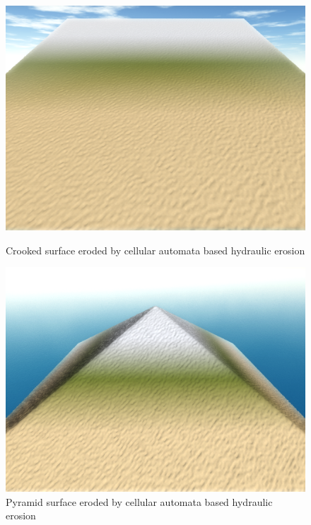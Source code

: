 \documentclass[11pt,a4paper,twoside,openright]{report}
\begin{document}
\begin{figure}[!htb]
  \includegraphics[width=\linewidth]{hydro-10mins-46k-iterations-crooked.png}
  \caption{Crooked surface eroded by cellular automata based hydraulic erosion}\label{fig:hydro1}
\endminipage\hfill
{}
  \includegraphics[width=\linewidth]{hydro-10mins-46k-iterations-pyramid.png}
  \caption{Pyramid surface eroded by cellular automata based hydraulic erosion}\label{fig:hydro2}
\endminipage\hfill
{}%

\end{figure}
\end{document}
